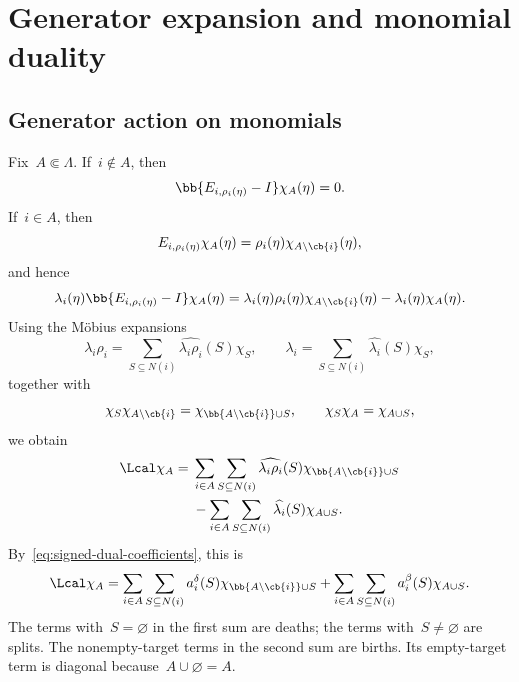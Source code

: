 \section{Generator expansion and monomial duality}
\label{app:dual-calculation}

\subsection{Generator action on monomials}
\label{app:generator-action}

Fix~$A\Subset\Lambda$. If~$i\notin A$, then
\begin{equation*}
\bb{E_{i,\rho_i(\eta)}-I}\chi_A(\eta)=0.
\end{equation*}
If~$i\in A$, then
\begin{equation*}
E_{i,\rho_i(\eta)}\chi_A(\eta)
=
\rho_i(\eta)\chi_{A\setminus\cb{i}}(\eta),
\end{equation*}
and hence
\begin{equation*}
\lambda_i(\eta)\bb{E_{i,\rho_i(\eta)}-I}\chi_A(\eta)
=
\lambda_i(\eta)\rho_i(\eta)\chi_{A\setminus\cb{i}}(\eta)
-
\lambda_i(\eta)\chi_A(\eta).
\end{equation*}
Using the M\"obius expansions
\begin{equation*}
\lambda_i\rho_i
=
\sum_{S\subseteq N(i)}\widehat{\lambda_i\rho_i}(S)\chi_S,
\qquad
\lambda_i
=
\sum_{S\subseteq N(i)}\widehat{\lambda_i}(S)\chi_S,
\end{equation*}
together with
\begin{equation*}
\chi_S\chi_{A\setminus\cb{i}}
=
\chi_{\bb{A\setminus\cb{i}}\cup S},
\qquad
\chi_S\chi_A=\chi_{A\cup S},
\end{equation*}
we obtain
\begin{align*}
\Lcal\chi_A
={}&
\sum_{i\in A}\sum_{S\subseteq N(i)}
\widehat{\lambda_i\rho_i}(S)
\chi_{\bb{A\setminus\cb{i}}\cup S}
\\
&-
\sum_{i\in A}\sum_{S\subseteq N(i)}
\widehat{\lambda_i}(S)\chi_{A\cup S}.
\end{align*}
By~\eqref{eq:signed-dual-coefficients}, this is
\begin{equation}
\label{eq:generator-action-monomials}
\Lcal\chi_A
=
\sum_{i\in A}\sum_{S\subseteq N(i)}
a_i^\delta(S)\chi_{\bb{A\setminus\cb{i}}\cup S}
+
\sum_{i\in A}\sum_{S\subseteq N(i)}
a_i^\beta(S)\chi_{A\cup S}.
\end{equation}
The terms with~$S=\varnothing$ in the first sum are deaths; the terms
with~$S\neq\varnothing$ are splits. The nonempty-target terms in the second sum
are births. Its empty-target term is diagonal
because~$A\cup\varnothing=A$.

